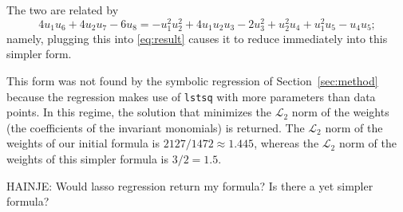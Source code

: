 \documentclass[12pt]{article}
\newcommand{\sectionname}{Section}
\newcommand{\secref}[1]{\sectionname~\ref{#1}}
\begin{document}
The two are related by
\begin{equation}
    4 u_1 u_6 + 4 u_2 u_7 - 6 u_8 = 
    -u_1^2 u_2^2 + 4 u_1 u_2 u_3 - 2 u_3^2 + u_2^2 u_4 + u_1^2 u_5 - u_4 u_5 ;
\end{equation}
namely, plugging this into \eqref{eq:result} causes it to reduce immediately into this simpler form.

This form was not found by the symbolic regression of \secref{sec:method} because the regression makes use of \verb+lstsq+ with more parameters than data points. In this regime, the solution that minimizes the $\mathcal{L}_2$ norm of the weights (the coefficients of the invariant monomials) is returned. The $\mathcal{L}_2$ norm of the weights of our initial formula is $2127 / 1472 \approx 1.445$, whereas the $\mathcal{L}_2$ norm of the weights of this simpler formula is $3/2 = 1.5$.

HAINJE: Would lasso regression return my formula? Is there a yet simpler formula?
\end{document}
